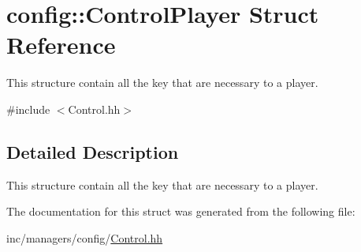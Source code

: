 \hypertarget{structconfig_1_1ControlPlayer}{}\section{config\+:\+:Control\+Player Struct Reference}
\label{structconfig_1_1ControlPlayer}


This structure contain all the key that are necessary to a player.  




{\ttfamily \#include $<$Control.\+hh$>$}



\subsection{Detailed Description}
This structure contain all the key that are necessary to a player. 

The documentation for this struct was generated from the following file\+:\begin{DoxyCompactItemize}
\item 
inc/managers/config/\hyperlink{Control_8hh}{Control.\+hh}\end{DoxyCompactItemize}

